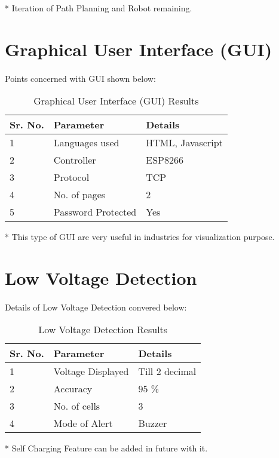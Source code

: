 * Iteration of Path Planning and Robot remaining.

\newpage

\section{Graphical User Interface (GUI)}
\paragraph{} Points concerned with GUI shown below:

\begin{table}[htbp]
\caption{Graphical User Interface (GUI) Results}
\begin{center}
\begin{tabular}{|p{1.5cm}|p{6cm}|p{4cm}|}
\hline \textbf{Sr. No.} & \textbf{Parameter} & \textbf{Details}\\
\hline 1 & Languages used & HTML, Javascript \\
\hline 2 & Controller & ESP8266 \\
\hline 3 & Protocol & TCP \\
\hline 4 & No. of pages & 2\\
\hline 5 & Password Protected & Yes\\
\hline
\end{tabular}
\end{center}
\end{table}

* This type of GUI are very useful in industries for visualization purpose.

\section{Low Voltage Detection}
\paragraph{} Details of Low Voltage Detection convered below:

\begin{table}[htbp]
\caption{Low Voltage Detection Results}
\begin{center}
\begin{tabular}{|p{1.5cm}|p{6cm}|p{4cm}|}
\hline \textbf{Sr. No.} & \textbf{Parameter} & \textbf{Details}\\
\hline 1 & Voltage Displayed & Till 2 decimal\\
\hline 2 & Accuracy & 95 \% \\
\hline 3 & No. of cells & 3 \\
\hline 4 & Mode of Alert & Buzzer\\
\hline
\end{tabular}
\end{center}
\end{table}

* Self Charging Feature can be added in future with it.

